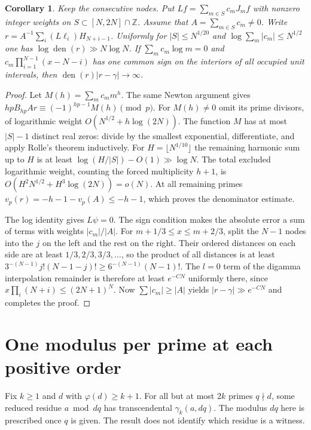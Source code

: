 \documentclass[11pt,a4paper,oneside,openany]{report}
\newtheorem{corollary}[theorem]{Corollary}
\theoremstyle{remark}\newtheorem{remark}[theorem]{Remark}
\numberwithin{equation}{section}
\begin{document}
\begin{corollary}\label{ch6:cor:quadmanylogs}
Keep the consecutive nodes. Put $Lf=\sum_{m\in S}c_mJ_m f$ with nonzero integer weights on $S\subset[N,2N]\cap\mathbb Z$. Assume that $A=\sum_{m\in S}c_m\ne0$. Write $r=A^{-1}\sum_i(L\ell_i)H_{N+i-1}$. Uniformly for $|S|\le N^{1/20}$ and $\log\sum_m|c_m|\le N^{1/2}$ one has $\log\operatorname{den}(r)\gg N\log N$. If $\sum_m c_m\log m=0$ and $c_m\prod_{i=1}^{N-1}(x-N-i)$ has one common sign on the interiors of all occupied unit intervals, then $\operatorname{den}(r)|r-\gamma|\to\infty$.
\end{corollary}
\begin{proof}
Let $M(h)=\sum_m c_m m^h$. The same Newton argument gives $hpB_{hp}Ar\equiv(-1)^{hp-1}M(h)\pmod p$. For $M(h)\ne0$ omit its prime divisors, of logarithmic weight $O(N^{1/2}+h\log(2N))$. The function $M$ has at most $|S|-1$ distinct real zeros: divide by the smallest exponential, differentiate, and apply Rolle's theorem inductively. For $H=\lfloor N^{1/10}\rfloor$ the remaining harmonic sum up to $H$ is at least $\log(H/|S|)-O(1)\gg\log N$. The total excluded logarithmic weight, counting the forced multiplicity $h+1$, is $O(H^2N^{1/2}+H^3\log(2N))=o(N)$. At all remaining primes $v_p(r)=-h-1-v_p(A)\le-h-1$, which proves the denominator estimate.

The log identity gives $L\psi=0$. The sign condition makes the absolute error a sum of terms with weights $|c_m|/|A|$. For $m+1/3\le x\le m+2/3$, split the $N-1$ nodes into the $j$ on the left and the rest on the right. Their ordered distances on each side are at least $1/3, 2/3, 3/3,\ldots$, so the product of all distances is at least $3^{-(N-1)}j!(N-1-j)!\ge6^{-(N-1)}(N-1)!$. The $l=0$ term of the digamma interpolation remainder is therefore at least $e^{-CN}$ uniformly there, since $x\prod_i(N+i)\le(2N+1)^N$. Now $\sum|c_m|\ge|A|$ yields $|r-\gamma|\gg e^{-CN}$ and completes the proof.
\end{proof}

\section{One modulus per prime at each positive order}\label{ch6:sec:oneprime}
Fix $k\ge1$ and $d$ with $\varphi(d)\ge k+1$. For all but at most $2k$
primes $q\nmid d$, some reduced residue $a\bmod dq$ has transcendental
$\gamma_k(a,dq)$. The modulus $dq$ here is prescribed once $q$ is
given. The result does not identify which residue is a witness.
\end{document}
